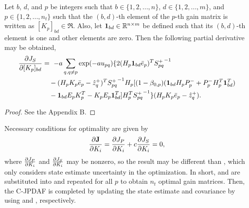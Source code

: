 \begin{prop}
Let $b$, $d$, and $p$ be integers such that $b\in\{1,2,...,n\}$,  $d\in\{1,2,...,m\}$, and $p\in\{1,2,...,n_t\}$ such that the $(b,d)$-th element of the $p$-th gain matrix is written as $[K_p]_{bd}\in\Re$.
Also, let $\mathbf{1}_{bd}\in \mathbb{R}^{n\times m}$ be defined such that its $(b,d)$-th element is one and other elements are zero.
Then the following partial derivative may be obtained,
\begin{align*}
\frac{\partial J_S}{\partial [K_p]_{bd}}&=\ -a\sum\limits_{q,q\neq p}\exp (-au_{pq})
\{
2(H_p\mathbf{1}_{bd}{\bar{e}}_p)^T
{S_{pq}^+}^{-1}
\nonumber
\\
& \quad
-(H_pK_p{\bar{e}}_p-\hat z^+_{q})^T
{S^+_{pq}}^{-1}
H_p
[(1-\beta_{0,p})(\mathbf{1}_{bd} H_pP_p^-
+P_p^-H_p^T\mathbf{1}_{bd}^T)
\nonumber
\\
& \quad
-\mathbf{1}_{bd} E_pK_p^T-K_pE_p\mathbf{1}_{bd}^T]
H_p^T
{S^+_{pq}}^{-1}
\}(H_pK_p{\bar{e}}_p-\hat z^+_{q}).
\end{align*}
\end{prop}
\begin{proof}
See the Appendix B.
\end{proof}


Necessary conditions for optimality are given by
\begin{align}
\frac{\partial \mathbf{J}}{\partial K_i} = \frac{\partial J_P}{\partial K_i} + c \frac{\partial J_S}{\partial K_i} =0,\label{eqn:NCO}
\end{align}
where $\frac{\partial J_P}{\partial K_i}$ and $\frac{\partial J_S}{\partial K_i}$ may be nonzero, so the result may be different than , which only considers state estimate uncertainty in the optimization.
In short,  and  are substituted into  and repeated for all $p$ to obtain $n_t$ optimal gain matrices.
Then, the C-JPDAF is completed by updating the state estimate and covariance by using  and , respectively.


